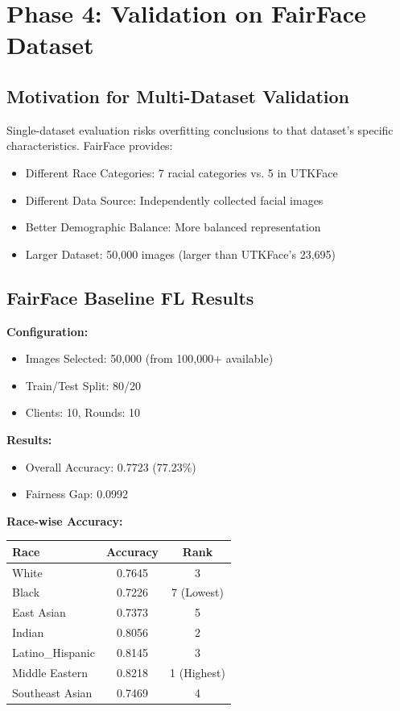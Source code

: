 \documentclass[11pt,a4paper]{report}
\begin{document}
\chapter{Phase 4: Validation on FairFace Dataset}

\section{Motivation for Multi-Dataset Validation}

Single-dataset evaluation risks overfitting conclusions to that dataset's specific characteristics. FairFace provides:

\begin{itemize}
    \item Different Race Categories: 7 racial categories vs. 5 in UTKFace
    \item Different Data Source: Independently collected facial images
    \item Better Demographic Balance: More balanced representation
    \item Larger Dataset: 50,000 images (larger than UTKFace's 23,695)
\end{itemize}

\section{FairFace Baseline FL Results}

\textbf{Configuration:}
\begin{itemize}
    \item Images Selected: 50,000 (from 100,000+ available)
    \item Train/Test Split: 80/20
    \item Clients: 10, Rounds: 10
\end{itemize}

\textbf{Results:}
\begin{itemize}
    \item Overall Accuracy: 0.7723 (77.23\%)
    \item Fairness Gap: 0.0992
\end{itemize}

\textbf{Race-wise Accuracy:}
\begin{table}[h]
\centering
\begin{tabular}{lcc}
\toprule
\textbf{Race} & \textbf{Accuracy} & \textbf{Rank} \\
\midrule
White & 0.7645 & 3 \\
Black & 0.7226 & 7 (Lowest) \\
East Asian & 0.7373 & 5 \\
Indian & 0.8056 & 2 \\
Latino\_Hispanic & 0.8145 & 3 \\
Middle Eastern & 0.8218 & 1 (Highest) \\
Southeast Asian & 0.7469 & 4 \\
\bottomrule
\end{tabular}
\end{table}
\end{document}
